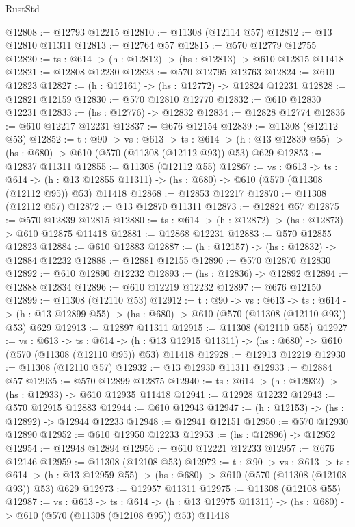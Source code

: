 \begin{lexlean}{RustStd}
\begin{coremodule}
@12808 := @12793 @12215
@12810 := @11308 (@12114 @57)
@12812 := @13 @12810 @11311
@12813 := @12764 @57
@12815 := @570 @12779 @12755
@12820 := {ts : @614} -> (h : @12812) -> (hs : @12813) -> @610 @12815 @11418
@12821 := @12808 @12230
@12823 := @570 @12795 @12763
@12824 := @610 @12823
@12827 := (h : @12161) -> (hs : @12772) -> @12824 @12231
@12828 := @12821 @12159
@12830 := @570 @12810 @12770
@12832 := @610 @12830 @12231
@12833 := (hs : @12776) -> @12832
@12834 := @12828 @12774
@12836 := @610 @12217 @12231
@12837 := @676 @12154
@12839 := @11308 (@12112 @53)
@12852 := {t : @90} ->
  {vs : @613} ->
  {ts : @614} -> (h : @13 @12839 @55) -> (hs : @680) -> @610 (@570 (@11308 (@12112 @93)) @53) @629
@12853 := @12837 @11311
@12855 := @11308 (@12112 @55)
@12867 := {vs : @613} ->
  {ts : @614} ->
  (h : @13 @12855 @11311) -> (hs : @680) -> @610 (@570 (@11308 (@12112 @95)) @53) @11418
@12868 := @12853 @12217
@12870 := @11308 (@12112 @57)
@12872 := @13 @12870 @11311
@12873 := @12824 @57
@12875 := @570 @12839 @12815
@12880 := {ts : @614} -> (h : @12872) -> (hs : @12873) -> @610 @12875 @11418
@12881 := @12868 @12231
@12883 := @570 @12855 @12823
@12884 := @610 @12883
@12887 := (h : @12157) -> (hs : @12832) -> @12884 @12232
@12888 := @12881 @12155
@12890 := @570 @12870 @12830
@12892 := @610 @12890 @12232
@12893 := (hs : @12836) -> @12892
@12894 := @12888 @12834
@12896 := @610 @12219 @12232
@12897 := @676 @12150
@12899 := @11308 (@12110 @53)
@12912 := {t : @90} ->
  {vs : @613} ->
  {ts : @614} -> (h : @13 @12899 @55) -> (hs : @680) -> @610 (@570 (@11308 (@12110 @93)) @53) @629
@12913 := @12897 @11311
@12915 := @11308 (@12110 @55)
@12927 := {vs : @613} ->
  {ts : @614} ->
  (h : @13 @12915 @11311) -> (hs : @680) -> @610 (@570 (@11308 (@12110 @95)) @53) @11418
@12928 := @12913 @12219
@12930 := @11308 (@12110 @57)
@12932 := @13 @12930 @11311
@12933 := @12884 @57
@12935 := @570 @12899 @12875
@12940 := {ts : @614} -> (h : @12932) -> (hs : @12933) -> @610 @12935 @11418
@12941 := @12928 @12232
@12943 := @570 @12915 @12883
@12944 := @610 @12943
@12947 := (h : @12153) -> (hs : @12892) -> @12944 @12233
@12948 := @12941 @12151
@12950 := @570 @12930 @12890
@12952 := @610 @12950 @12233
@12953 := (hs : @12896) -> @12952
@12954 := @12948 @12894
@12956 := @610 @12221 @12233
@12957 := @676 @12146
@12959 := @11308 (@12108 @53)
@12972 := {t : @90} ->
  {vs : @613} ->
  {ts : @614} -> (h : @13 @12959 @55) -> (hs : @680) -> @610 (@570 (@11308 (@12108 @93)) @53) @629
@12973 := @12957 @11311
@12975 := @11308 (@12108 @55)
@12987 := {vs : @613} ->
  {ts : @614} ->
  (h : @13 @12975 @11311) -> (hs : @680) -> @610 (@570 (@11308 (@12108 @95)) @53) @11418

\end{coremodule}
\end{lexlean}
